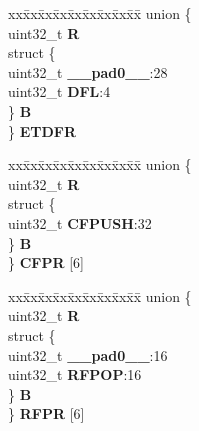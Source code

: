 \begin{DoxyCompactItemize}
\begin{tabbing}
\end{tabbing}\item 
\mbox{\label{structEQADC__tag_a1b3c62c970144a0ed2b878783221acea}} 
\begin{tabbing}
xx\=xx\=xx\=xx\=xx\=xx\=xx\=xx\=xx\=\kill
union \{\\
\>uint32\_t {\bfseries R}\\
\>struct \{\\
\>\>uint32\_t {\bfseries \_\_pad0\_\_}:28\\
\>\>uint32\_t {\bfseries DFL}:4\\
\>\} {\bfseries B}\\
\} {\bfseries ETDFR}\\

\end{tabbing}\item 
\mbox{\label{structEQADC__tag_a6cadc66153405e121a28ea20e56523ed}} 
\begin{tabbing}
xx\=xx\=xx\=xx\=xx\=xx\=xx\=xx\=xx\=\kill
union \{\\
\>uint32\_t {\bfseries R}\\
\>struct \{\\
\>\>uint32\_t {\bfseries CFPUSH}:32\\
\>\} {\bfseries B}\\
\} {\bfseries CFPR} \mbox{[}6\mbox{]}\\

\end{tabbing}\item 
\mbox{\label{structEQADC__tag_a31271c538081f7b3214cc9201a507f13}} 
\begin{tabbing}
xx\=xx\=xx\=xx\=xx\=xx\=xx\=xx\=xx\=\kill
union \{\\
\>uint32\_t {\bfseries R}\\
\>struct \{\\
\>\>uint32\_t {\bfseries \_\_pad0\_\_}:16\\
\>\>uint32\_t {\bfseries RFPOP}:16\\
\>\} {\bfseries B}\\
\} {\bfseries RFPR} \mbox{[}6\mbox{]}\\


\end{tabbing}
\end{DoxyCompactItemize}
